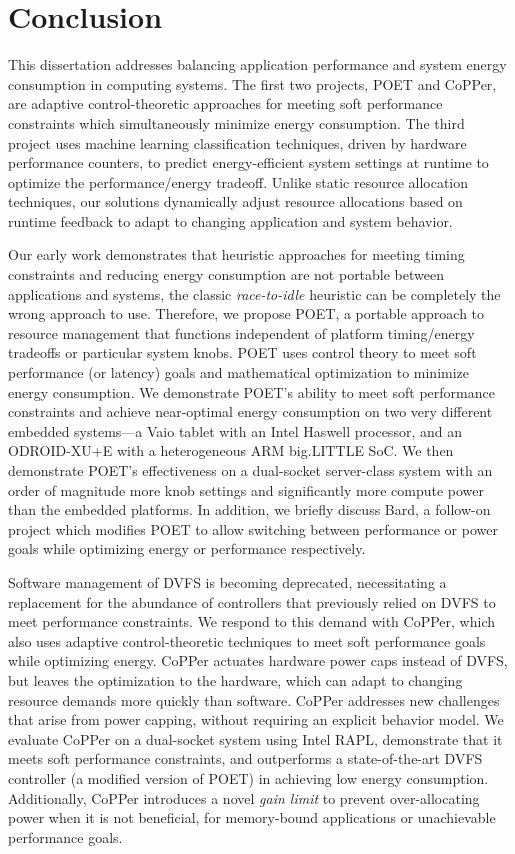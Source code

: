 \chapter{Conclusion}

This dissertation addresses balancing application performance and system energy consumption in computing systems.
The first two projects, POET and CoPPer, are adaptive control-theoretic approaches for meeting soft performance constraints which simultaneously minimize energy consumption.
The third project uses machine learning classification techniques, driven by hardware performance counters, to predict energy-efficient system settings at runtime to optimize the performance/energy tradeoff.
Unlike static resource allocation techniques, our solutions dynamically adjust resource allocations based on runtime feedback to adapt to changing application and system behavior.

Our early work demonstrates that heuristic approaches for meeting timing constraints and reducing energy consumption are not portable between applications and systems, \eg the classic \emph{race-to-idle} heuristic can be completely the wrong approach to use.
Therefore, we propose POET, a portable approach to resource management that functions independent of platform timing/energy tradeoffs or particular system knobs.
POET uses control theory to meet soft performance (or latency) goals and mathematical optimization to minimize energy consumption.
We demonstrate POET's ability to meet soft performance constraints and achieve near-optimal energy consumption on two very different embedded systems---a Vaio tablet with an Intel Haswell processor, and an ODROID-XU+E with a heterogeneous ARM big.LITTLE SoC.
We then demonstrate POET's effectiveness on a dual-socket server-class system with an order of magnitude more knob settings and significantly more compute power than the embedded platforms.
In addition, we briefly discuss Bard, a follow-on project which modifies POET to allow switching between performance or power goals while optimizing energy or performance respectively.

Software management of DVFS is becoming deprecated, necessitating a replacement for the abundance of controllers that previously relied on DVFS to meet performance constraints.
We respond to this demand with CoPPer, which also uses adaptive control-theoretic techniques to meet soft performance goals while optimizing energy.
CoPPer actuates hardware power caps instead of DVFS, but leaves the optimization to the hardware, which can adapt to changing resource demands more quickly than software.
CoPPer addresses new challenges that arise from power capping, without requiring an explicit behavior model.
We evaluate CoPPer on a dual-socket system using Intel RAPL, demonstrate that it meets soft performance constraints, and outperforms a state-of-the-art DVFS controller (a modified version of POET) in achieving low energy consumption.
Additionally, CoPPer introduces a novel \emph{gain limit} to prevent over-allocating power when it is not beneficial, \eg for memory-bound applications or unachievable performance goals.

